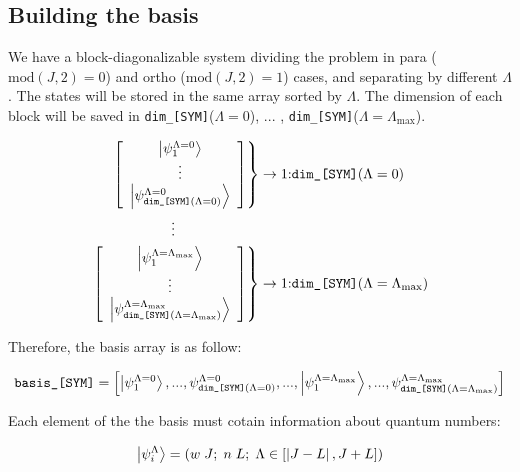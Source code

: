 \documentclass[english,twoside, openright]{report}
\newcommand{\Abs}[1]{
  \left|#1\right|
}
\begin{document}
\subsection{Building the basis}

We have a block-diagonalizable system dividing the problem in para
($\text{mod}(J,2)=0$) and ortho ($\text{mod}(J,2)=1$) cases, and
separating by different $\Lambda$. The states will be stored in the
same array sorted by $\Lambda$. The dimension of each block will be
saved in \texttt{dim\_[SYM]}($\Lambda=0$), ... ,
\texttt{dim\_[SYM]}($\Lambda=\Lambda_{\text{max}}$).

\begin{align}
  \left.\left[
  \begin{array}{c}
    \ket{\psi_{1}^{\Lambda=0} }\\
    \vdots \\
    \ket{\psi_{\text{\texttt{dim\_[SYM]}}(\Lambda=0)}^{\Lambda=0}}
  \end{array}
  \right]\right\}& \rightarrow \text{1:\texttt{dim\_[SYM]}}(\Lambda=0)
  \nonumber\\
  \vdots  \qquad \qquad \qquad &
  \\
  \left.\left[
  \begin{array}{c}
    \ket{\psi_{1}^{\Lambda=\Lambda_{\text{max}}} }\\
    \vdots \\
    \ket{\psi_{\text{\texttt{dim\_[SYM]}}(\Lambda=\Lambda_{\text{max}})}^{\Lambda=\Lambda_{\text{max}}}}
  \end{array}
  \right]\right\}& \rightarrow \text{1:\texttt{dim\_[SYM]}}(\Lambda=\Lambda_{\text{max}}) \nonumber
\end{align}

Therefore, the basis array is as follow:

\begin{equation}
  \text{\texttt{basis\_[SYM]}}=\left[\ket{\psi_{1}^{\Lambda=0}},...,\psi_{\text{\texttt{dim\_[SYM]}}(\Lambda=0)}^{\Lambda=0},...,\ket{\psi_{1}^{\Lambda=\Lambda_{\text{max}}}},...,\psi_{\text{\texttt{dim\_[SYM]}}(\Lambda=\Lambda_{\text{max}})}^{\Lambda=\Lambda_{\text{max}}}\right]
\end{equation}

Each element of the the basis must cotain information about quantum numbers:

\begin{align}
  \ket{\psi_i^{\Lambda}}=\left(w\;J;\;n\;L;\;\Lambda\in\left[\Abs{J-L},J+L\right]\right)
\end{align}
\end{document}
